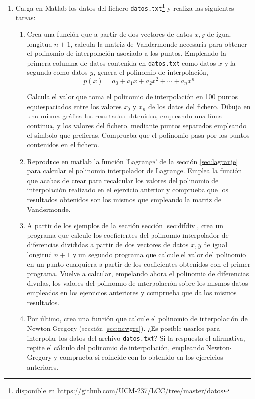 \begin{enumerate}
\item Carga en Matlab los datos del fichero \texttt{datos.txt}\footnote{disponible en \url{https://github.com/UCM-237/LCC/tree/master/datos}} y realiza las siguientes tareas:
\begin{enumerate}
\item \label{ej1a} Crea una función que a partir de dos vectores de datos $x,y$ de igual longitud $n+1$, calcula la matriz de Vandermonde necesaria   para obtener el polinomio de interpolación asociado a los puntos. Empleando la primera columna de datos contenida en \texttt{datos.txt} como datos $x$ y la segunda como datos $y$, genera el polinomio de interpolación,
\begin{equation*}
p(x)=a_0+a_1x+a_2x^2+\cdots+a_nx^n
\end{equation*}

Calcula el valor que toma el polinomio de interpolación en 100 puntos equiespaciados entre los valores $x_0$ y $x_{n}$ de los datos del fichero. Dibuja en una misma gráfica los resultados obtenidos, empleando una línea continua, y los valores del fichero, mediante puntos separados empleando el símbolo que prefieras. Comprueba que el polinomio pasa por los puntos contenidos en el fichero.

\item Reproduce en matlab la función 'Lagrange' de la sección \ref{sec:lagranje} para calcular el polinomio interpolador de Lagrange. Emplea la función que acabas de crear para recalcular los valores del polinomio de interpolación realizado en el ejercicio anterior y comprueba que los resultados obtenidos son los mismos que empleando la matriz de Vandermonde.

\item A partir de los ejemplos de la sección  sección \ref{sec:difdiv}, crea un programa que calcule los coeficientes del polinomio interpolador de diferencias divididas a partir de dos vectores de datos  $x,y$ de igual longitud $n+1$ y un segundo programa que calcule el valor del polinomio en un punto cualquiera a partir de los coeficientes obtenidos con el primer programa. Vuelve a calcular, empelando ahora el polinomio de diferencias dividas, los valores del polinomio de interpolación sobre los mismos datos empleados en los ejercicios anteriores y comprueba que da los mismos resultados.

\item Por último, crea una función que calcule el polinomio de interpolación de Newton-Gregory (sección \ref{sec:newgre}). ¿Es posible usarlos para interpolar los datos del archivo \texttt{datos.txt}? Si la respuesta el afirmativa, repite el cálculo del polinomio de interpolación, empleando Newton-Gregory y comprueba si coincide con lo obtenido en los ejercicios anteriores.


\end{enumerate}
\end{enumerate}
